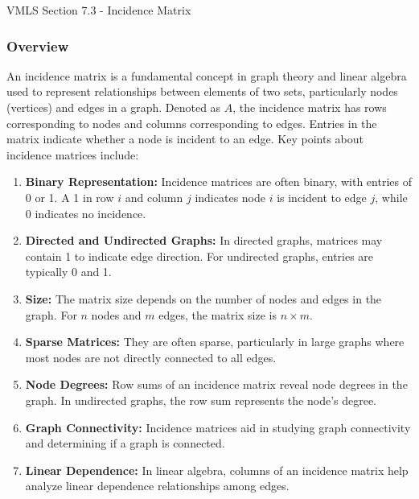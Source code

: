 \begin{notes}{VMLS Section 7.3 - Incidence Matrix}
    \subsubsection*{Overview}

    An incidence matrix is a fundamental concept in graph theory and linear algebra used to represent relationships between elements of two sets, particularly nodes (vertices) and edges in a graph. 
    Denoted as $A$, the incidence matrix has rows corresponding to nodes and columns corresponding to edges. Entries in the matrix indicate whether a node is incident to an edge. Key points about 
    incidence matrices include:

    \begin{enumerate}
        \item \textbf{Binary Representation:} Incidence matrices are often binary, with entries of 0 or 1. A 1 in row $i$ and column $j$ indicates node $i$ is incident to edge $j$, while 0 indicates 
        no incidence.
        
        \item \textbf{Directed and Undirected Graphs:} In directed graphs, matrices may contain 1 to indicate edge direction. For undirected graphs, entries are typically 0 and 1.
        
        \item \textbf{Size:} The matrix size depends on the number of nodes and edges in the graph. For $n$ nodes and $m$ edges, the matrix size is $n \times m$.
        
        \item \textbf{Sparse Matrices:} They are often sparse, particularly in large graphs where most nodes are not directly connected to all edges.
        
        \item \textbf{Node Degrees:} Row sums of an incidence matrix reveal node degrees in the graph. In undirected graphs, the row sum represents the node's degree.
        
        \item \textbf{Graph Connectivity:} Incidence matrices aid in studying graph connectivity and determining if a graph is connected.
        
        \item \textbf{Linear Dependence:} In linear algebra, columns of an incidence matrix help analyze linear dependence relationships among edges.
        

\end{enumerate}
\end{notes}

